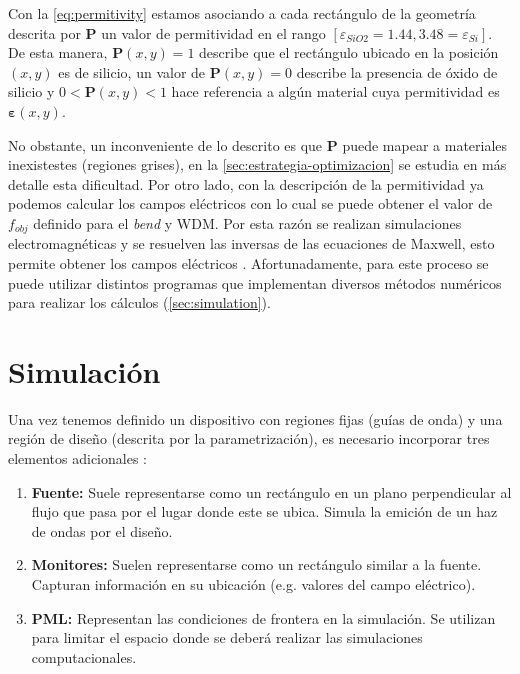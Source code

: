 Con la \autoref{eq:permitivity} estamos asociando a cada rectángulo de la geometría descrita por
$\boldsymbol{P}$ un valor de permitividad en el rango 
$[\varepsilon_{SiO2} = 1.44, 3.48 = \varepsilon_{Si}]$.
De esta manera, $\boldsymbol{P}(x, y) = 1$ describe que el rectángulo ubicado en la posición $(x, y)$ es de silicio,
un valor de $\boldsymbol{P}(x, y) = 0$ describe la presencia de óxido de silicio y 
$0 < \boldsymbol{P}(x, y) < 1$ hace referencia
a algún material cuya permitividad es $\boldsymbol{\varepsilon}(x, y)$.

No obstante, un inconveniente de lo descrito es que $\boldsymbol{P}$ puede mapear a materiales inexistestes
(regiones grises),
en la \autoref{sec:estrategia-optimizacion} se estudia en más detalle esta dificultad.
Por otro lado, con la descripción de la permitividad ya podemos calcular los campos eléctricos con lo
cual se puede obtener el valor de $f_{obj}$ definido para el \emph{bend} y WDM.
Por esta razón se realizan simulaciones electromagnéticas y se resuelven las inversas de las 
ecuaciones de Maxwell, esto permite obtener los campos eléctricos \citep{Su2020}.
Afortunadamente, para este proceso se puede utilizar distintos programas que implementan diversos 
métodos numéricos para realizar los cálculos (\autoref{sec:simulation}).

\section{Simulación}\label{sec:simulation}

Una vez tenemos definido un dispositivo con regiones fijas (guías de onda) y una
región de diseño (descrita por la parametrización), es necesario incorporar
tres elementos adicionales \citep{Oskooi2010, Su2020}:

\begin{enumerate}

  \item \textbf{Fuente:} Suele representarse como un rectángulo en un plano perpendicular al flujo
    que pasa por el lugar donde este se ubica. Simula la emición de un haz de ondas por el diseño.

  \item \textbf{Monitores:} Suelen representarse como un rectángulo similar a la fuente.
    Capturan información en su ubicación (e.g. valores del campo eléctrico).

  \item \textbf{PML:} Representan las condiciones de frontera en la simulación. 
    Se utilizan para limitar el espacio donde se deberá realizar las simulaciones computacionales.

\end{enumerate}

